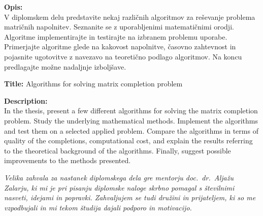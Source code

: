 \documentclass[a4paper,12pt,openright]{book}
\newcommand{\clearemptydoublepage}{\newpage{\pagestyle{empty}\cleardoublepage}}
\begin{document}
\bigskip
\noindent\textbf{Opis:}\\
V diplomskem delu 
predstavite nekaj različnih algoritmov za reševanje problema matričnih napolnitev. Seznanite se z uporabljenimi matematičnimi orodji. Algoritme implementirajte in testirajte na izbranem problemu uporabe.
Primerjajte algoritme glede na kakovost napolnitve, časovno zahtevnost in pojasnite ugotovitve z navezavo na teoretično podlago algoritmov. Na koncu predlagajte možne nadaljnje izboljšave.

\bigskip
\noindent\textbf{Title:} Algorithms for solving matrix completion problem

\bigskip
\noindent\textbf{Description:}\\
In the thesis, 
present a few different algorithms for solving the matrix completion problem.
Study the underlying mathematical methods. Implement the algorithms and test them on a selected applied problem. Compare the algorithms in terms of quality of the completions, computational cost, and explain the results referring to the theoretical background of the algorithms. Finally, suggest possible improvements to the methods presented.
\vfill



\vspace{2cm}

\clearemptydoublepage

\thispagestyle{empty}\mbox{}\vfill\null\it%
\noindent
Velika zahvala za nastanek diplomskega dela gre mentorju doc.\ dr.\ Aljažu Zalarju, ki mi je pri pisanju diplomske naloge skrbno pomagal s številnimi nasveti, idejami in popravki.
Zahvaljujem se tudi družini in prijateljem, ki so me vzpodbujali in mi tekom študija dajali podporo in motivacijo.

\rm\normalfont

\clearemptydoublepage


\clearemptydoublepage


\pagestyle{empty}
\def\thepage{}%
\tableofcontents{}
\end{document}
